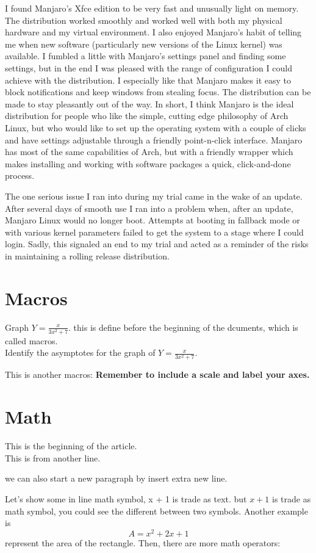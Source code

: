 \documentclass[11pt]{article}
\def\eq1{Y=\frac{x}{3x^2+7}}
\def\labelaxes{Remember to include a scale and label your axes.}
\begin{document}
I found Manjaro's Xfce edition to be very fast and unusually light on memory. The distribution worked smoothly and worked well with both my physical hardware and my virtual environment. I also enjoyed Manjaro's habit of telling me when new software (particularly new versions of the Linux kernel) was available. I fumbled a little with Manjaro's settings panel and finding some settings, but in the end I was pleased with the range of configuration I could achieve with the distribution. I especially like that Manjaro makes it easy to block notifications and keep windows from stealing focus. The distribution can be made to stay pleasantly out of the way. In short, I think Manjaro is the ideal distribution for people who like the simple, cutting edge philosophy of Arch Linux, but who would like to set up the operating system with a couple of clicks and have settings adjustable through a friendly point-n-click interface. Manjaro has most of the same capabilities of Arch, but with a friendly wrapper which makes installing and working with software packages a quick, click-and-done process.

The one serious issue I ran into during my trial came in the wake of an update. After several days of smooth use I ran into a problem when, after an update, Manjaro Linux would no longer boot. Attempts at booting in fallback mode or with various kernel parameters failed to get the system to a stage where I could login. Sadly, this signaled an end to my trial and acted as a reminder of the risks in maintaining a rolling release distribution.



\section{Macros}
Graph $\eq1$. this is define before the beginning of the dcuments, which is called macros.\\
Identify the asymptotes for the graph of $\eq1$.

This is another macros: \textbf{\labelaxes}

\section{Math}
This is the beginning of the article.\\ This is from another line. 

we can also start a new paragraph by insert extra new line. 

Let's show some in line math symbol, x + 1 is trade as text. but $x + 1$ is trade as math symbol, you could see the different between two symbols. Another example is $$A = x^2 + 2x + 1 $$ represent the area of the rectangle. Then, there are more math operators:
\end{document}
